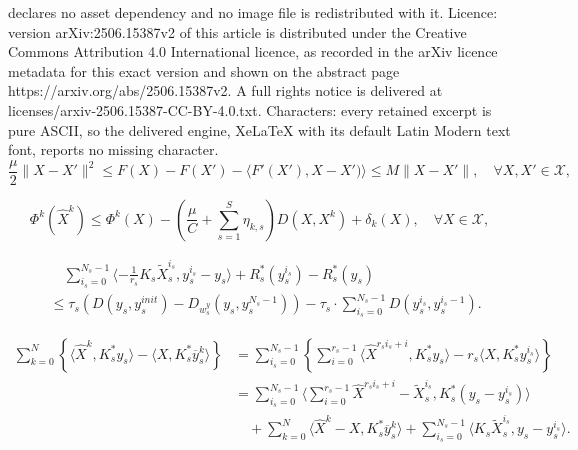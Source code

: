 \documentclass[10pt,a4paper]{amsart}
\newcommand{\mc}{\mathcal}
\begin{document}
declares no asset dependency and no image file is redistributed with it. Licence: version arXiv:2506.15387v2 of this article is distributed under the Creative Commons Attribution 4.0 International licence, as recorded in the arXiv licence metadata for this exact version and shown on the abstract page https://arxiv.org/abs/2506.15387v2. A full rights notice is delivered at licenses/arxiv-2506.15387-CC-BY-4.0.txt. Characters: every retained excerpt is pure ASCII, so the delivered engine, XeLaTeX with its default Latin Modern text font, reports no missing character.
\begin{equation}\label{eq:prop-F}
    \frac{\mu}{2}\|X-X'\|^2\leq F(X) - F(X')-\langle F' (X'),X-X')\rangle\leq M\|X-X'\|,\quad\forall X,X'\in \mc X,
\end{equation}

\begin{equation}\label{eq:primal-approx-prop}
    \Phi^k(\widehat{X}^k) \leq \Phi^k(X) -(\frac{\mu}{C}+\sum_{s=1}^S\eta_{k,s})D(X,X^k)+\delta_k(X),\quad \forall X\in \mc X,
\end{equation}

\begin{align}\label{eq:dual_bound}
     &\quad \sum_{i_s=0}^{N_s-1}\langle -\frac{1}{r_s}K_{s}\widetilde{X}_{s}^{i_s},y_s^{i_s}-y_s\rangle + R^*_s(y_s^{i_s})  - R^*_s(y_s)\nonumber\\
     &\leq \tau_{s} \left (D(y_s,y_s^{init}) - D_{w^y_s}(y_s,y_s^{N_s-1})\right) - \tau_{s} \cdot\sum_{i_s=0}^{N_s-1} D(y^{i_s}_s,y_s^{i_s-1}).
\end{align}

\begin{align}\label{eq:mix_terms}
 \sum_{k=0}^{N}\left\{\langle \widehat{X}^{k},K_s^*y_s\rangle - \langle X,K^*_s\overline{y}_s^{k}\rangle\right\}&= \sum_{i_s=0}^{N_s-1}\left\{\sum_{i=0}^{r_s-1}\langle \widehat{X}^{r_si_s+i},K^*_{s}y_s\rangle - r_s\langle X,K^*_{s}y_s^{i_s}\rangle\right\}\nonumber\\
    &= \sum_{i_s=0}^{N_s-1}\langle\sum_{i=0}^{r_s-1} \widehat{X}^{r_si_s+i}-\widetilde{X}_{s}^{i_s},K^*_{s}(y_s-y_s^{i_s})\rangle \nonumber \\
    &\quad +\sum_{k=0}^N \langle \widehat{X}^{k}-X,K^*_{s}\overline{y}_s^{k}\rangle +\sum_{i_s=0}^{N_s-1} \langle K_{s}\widetilde{X}_{s}^{i_s}, y_s- y_s^{i_s}\rangle .
\end{align}
\end{document}
